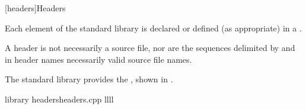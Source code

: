 [headers]{Headers}

\pnum
Each element of the \Cpp{} standard library is declared or defined (as appropriate) in a
.
\begin{footnote}
A header is not necessarily a source file, nor are the
sequences delimited by \tcode{<} and \tcode{>} in header names necessarily valid source
file names.
\end{footnote}

\pnum
The \Cpp{} standard library provides the
,
shown in .

\begin{multicolfloattable}{\Cpp{} library headers}{headers.cpp}
{llll}
 \\
 \\
 \\
 \\
 \\
 \\
 \\
 \\
 \\
 \\
 \\
 \\
 \\
 \\
 \\
 \\
 \\
 \\
 \\
 \\
 \\
 \\
\columnbreak
{} \\
 \\
 \\
 \\
 \\
 \\
 \\
 \\

\end{multicolfloattable}
